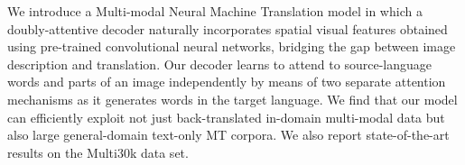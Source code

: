 We introduce a Multi-modal Neural Machine Translation model in which a doubly-attentive decoder naturally incorporates spatial visual features obtained using pre-trained convolutional neural networks, bridging the gap between image description and translation. Our decoder learns to attend to source-language words and parts of an image independently by means of two separate attention mechanisms as it generates words in the target language. We find that our model can efficiently exploit not just back-translated in-domain multi-modal data but also large general-domain text-only MT corpora. We also report state-of-the-art results on the Multi30k data set.
